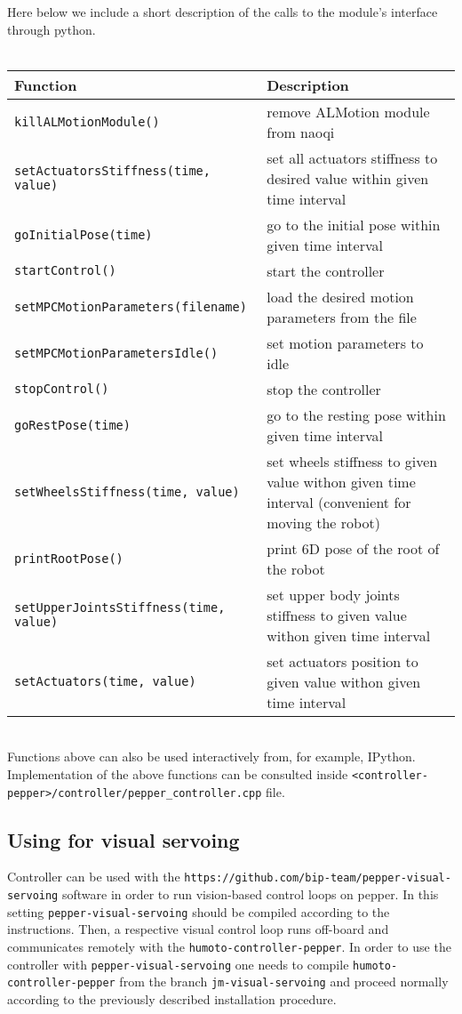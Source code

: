 \noindent Here below we include a short description of the calls to the module's interface through python. \\ \\
\begin{tabular}{|l|p{5cm}|}
\hline
Function & Description \\
\hline
\texttt{killALMotionModule()} & remove ALMotion module from naoqi \\
\hline
\texttt{setActuatorsStiffness(time, value)} & set all actuators stiffness to desired
value within given time interval \\
\hline
\texttt{goInitialPose(time)} & go to the initial pose within given time interval \\
\hline
\texttt{startControl()} & start the controller \\
\hline
\texttt{setMPCMotionParameters(filename)} & load the desired motion parameters from the file \\
\hline
\texttt{setMPCMotionParametersIdle()} & set motion parameters to idle \\
\hline
\texttt{stopControl()} & stop the controller \\
\hline
\texttt{goRestPose(time)} & go to the resting pose within given time interval \\
\hline
\texttt{setWheelsStiffness(time, value)} & set wheels stiffness to given value withon given time interval (convenient for moving the
robot) \\
\hline
\texttt{printRootPose()} & print 6D pose of the root of the robot \\
\hline
\texttt{setUpperJointsStiffness(time, value)} & set upper body joints stiffness to given value withon given time interval \\
\hline
\texttt{setActuators(time, value)} & set actuators position to given value withon given time interval \\
\hline
\end{tabular} \\

\noindent Functions above can also be used interactively from, for example, IPython. Implementation of the above
functions can be consulted inside \texttt{<controller-pepper>/controller/pepper\_controller.cpp} file.

\subsection{Using for visual servoing}
\noindent Controller can be used with the \texttt{https://github.com/bip-team/pepper-visual-servoing}
software in order to run vision-based control loops on pepper. 
In this setting \texttt{pepper-visual-servoing} should be compiled according to the instructions. Then,
a respective visual control loop runs off-board and communicates remotely with the \texttt{humoto-controller-pepper}. 
In order to use the controller with \texttt{pepper-visual-servoing} one needs to compile \texttt{humoto-controller-pepper} from the branch
\texttt{jm-visual-servoing} and proceed normally according to the previously described installation procedure. \\ \\

